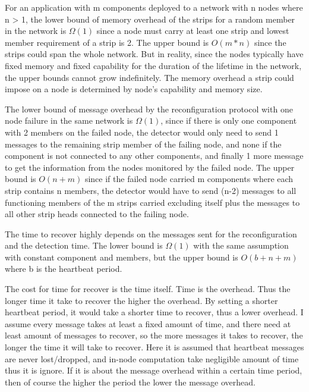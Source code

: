 For an application with m components deployed to a network with n nodes where
n > 1, the lower bound of memory overhead of the strips for a random member in
the network is $\Omega(1)$ since a node must carry at least one strip and lowest
member requirement of a strip is 2. The upper bound is $O(m*n)$ since the strips
could span the whole network. But in reality, since the nodes typically have
fixed memory and fixed capability for the duration of the lifetime in the
network, the upper bounds cannot grow indefinitely. The memory overhead a strip
could impose on a node is determined by node's capability and memory size.


The lower bound of message overhead by the reconfiguration protocol
with one node failure in the same network is $\Omega(1)$, since if there is only
one component with 2 members on the failed node, the detector would only need to
send 1 messages to the remaining strip member of the failing node, and none if
the component is not connected to any other components, and finally 1 more
message to get the information from the nodes monitored by the failed node. The
upper bound is $O(n + m)$ since if the failed node carried m components where each
strip contains n members, the detector would have to send (n-2) messages to all
functioning members of the m strips carried excluding itself plus the messages
to all other strip heads connected to the failing node. 

The time to recover highly depends on the messages sent for the reconfiguration
and the detection time. The lower bound is $\Omega(1)$ with the same assumption
with constant component and members, but the upper bound is $O(b + n + m)$ where
b is the heartbeat period.

The cost for time for recover is the time itself. Time is the overhead. Thus the
longer time it take to recover the higher the overhead. By setting a shorter
heartbeat period, it would take a shorter time to recover, thus a lower
overhead. I assume every message takes at least a fixed amount of time, and
there need at least amount of messages to recover, so the more messages it takes
to recover, the longer the time it will take to recover. Here it is assumed that
heartbeat messages are never lost/dropped, and in-node computation take
negligible amount of time thus it is ignore. If it is about the message overhead
within a certain time period, then of course the higher the period the lower the
message overhead.

